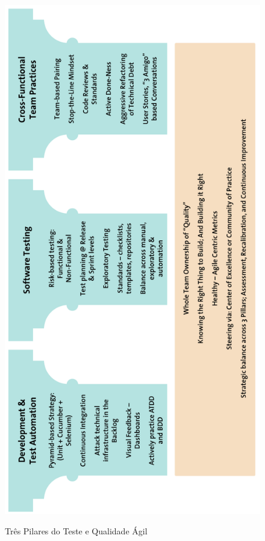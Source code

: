 \documentclass[
	12pt,				%
	openright,			%
	oneside,			%
	a4paper,			%
	english,			%
	brazil,				%
	]{abntex2}
\begin{document}
\begin{figure}[H]
    \centering
    \caption{Três Pilares do Teste e Qualidade Ágil}
    \graphicspath{ {./graphics/agile/} }
    \includegraphics[scale=0.6]{three-pillars}
    \label{fig:three-pillars}
\end{figure}
\end{document}
